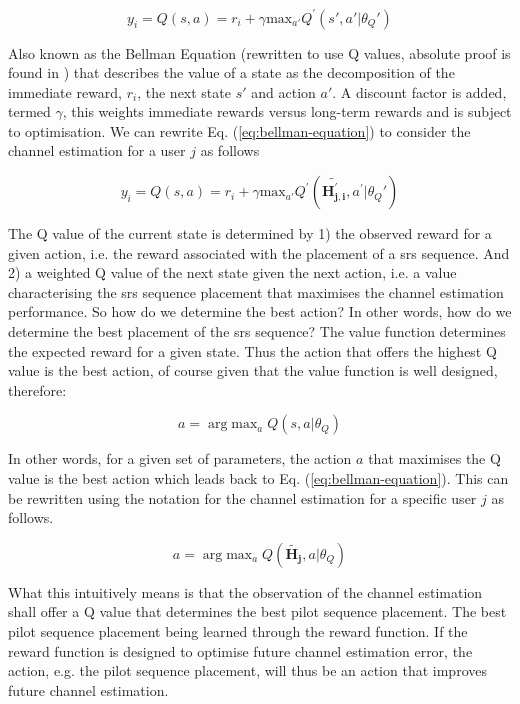 \begin{equation}\label{eq:bellman-equation}
    y_i = Q(s, a) = r_i + \gamma \text{max}_{a'} Q^{'}(s', a' | \theta_Q')
\end{equation}

Also known as the Bellman Equation (rewritten to use Q values, absolute proof is found in \cite{Sutton2017ReinforcementSecond}) that describes the value of a state as the decomposition of the immediate reward, $r_i$, the next state $s'$ and action $a'$. A discount factor is added, termed $\gamma$, this weights immediate rewards versus long-term rewards and is subject to optimisation. We can rewrite Eq. (\ref{eq:bellman-equation}) to consider the channel estimation for a user $j$  as follows

\begin{equation}\label{eq:value-function}
    y_i = Q(s, a) = r_i + \gamma \text{max}_{a'} Q^{'}(\mathbf{\widetilde{H_{j,i}^{'}}}, a^{'} | \theta_Q')
\end{equation}

The Q value of the current state is determined by 1) the observed reward for a given action, i.e. the reward associated with the placement of a \gls{srs} sequence. And 2) a weighted Q value of the next state given the next action, i.e. a value characterising the \gls{srs} sequence placement that maximises the channel estimation performance. So how do we determine the best action? In other words, how do we determine the best placement of the \gls{srs} sequence? The value function determines the expected reward for a given state. Thus the action that offers the highest Q value is the best action, of course given that the value function is well designed, therefore:

\begin{equation}\label{eq:critic-action}
    a = \arg \text{max}_{a} \; Q(s, a | \theta_Q)
\end{equation}

In other words, for a given set of parameters, the action $a$ that maximises the Q value is the best action which leads back to Eq. (\ref{eq:bellman-equation}). This can be rewritten using the notation for the channel estimation for a specific user $j$ as follows.

\begin{equation}\label{eq:critic-action}
    a = \arg \text{max}_{a} \; Q(\mathbf{\widetilde{H_{j}}}, a | \theta_Q)
\end{equation}

What this intuitively means is that the observation of the channel estimation shall offer a Q value that determines the best pilot sequence placement. The best pilot sequence placement being learned through the reward function. If the reward function is designed to optimise future channel estimation error, the action, e.g. the pilot sequence placement, will thus be an action that improves future channel estimation.

